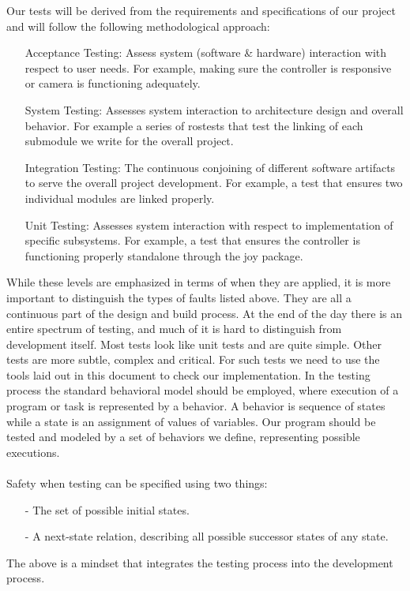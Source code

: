 \documentclass[english,12pt]{article}
\begin{document}
Our tests will be derived from the requirements and specifications of our project and will follow 
the following methodological approach:

\begin{itemize}
    \item[]Acceptance Testing: Assess system (software \& hardware) interaction with respect 
    to user needs. For example, making sure the controller is responsive or camera is functioning 
    adequately.
    \item[]System Testing: Assesses system interaction to architecture design and overall behavior. 
    For example a series of rostests that test the linking of each submodule we write for the overall 
    project.
    \item[]Integration Testing: The continuous conjoining of different software artifacts to 
    serve the overall project development. For example, a test that ensures two individual modules are 
    linked properly.
    \item[]Unit Testing: Assesses system interaction with respect to implementation of specific subsystems. 
    For example, a test that ensures the controller is functioning properly standalone through the joy 
    package.
\end{itemize}
While these levels are emphasized in terms of when they are applied, it is more important to distinguish 
the types of faults listed above. They are all a continuous part of the design and build process. At 
the end of the day there is an entire spectrum of testing, and much of it is hard to distinguish from 
development itself. Most tests look like unit tests and are quite simple. Other tests are more subtle, 
complex and critical. For such tests we need to use the tools laid out in this document to check our 
implementation. In the testing process the standard behavioral model should be employed, where 
execution of a program or task is represented by a behavior. A behavior is sequence of states while a state 
is an assignment of values of variables. Our program should be tested and modeled by a set of behaviors 
we define, representing possible executions. \\\\
Safety when testing can be specified using two things:\\
\begin{itemize}
    \item[-] The set of possible initial states.
    \item[-] A next-state relation, describing all possible successor states of any state. 
\end{itemize}
The above is a mindset that integrates the testing process into the development process.
\end{document}
